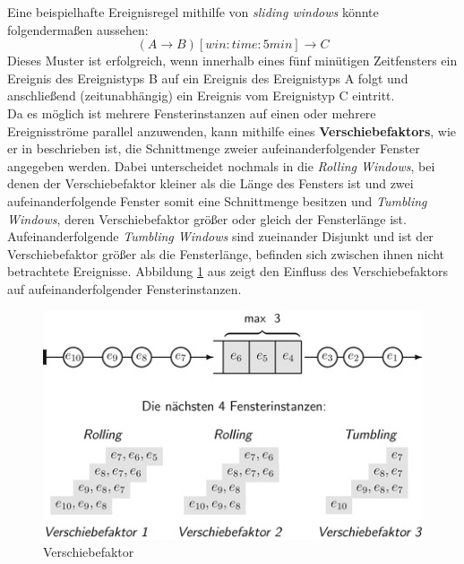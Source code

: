 \documentclass{acm_proc_article-sp}
\begin{document}
Eine beispielhafte Ereignisregel mithilfe von \textit{sliding windows} könnte 
folgendermaßen 
aussehen:
$$(A \rightarrow B)[win:time:5min] \rightarrow C$$
Dieses Muster ist erfolgreich, wenn innerhalb eines fünf minütigen Zeitfensters ein 
Ereignis des Ereignistyps B auf ein Ereignis des Ereignistyps A folgt und anschließend 
(zeitunabhängig) ein Ereignis vom Ereignistyp C eintritt.\\
Da es möglich ist mehrere Fensterinstanzen auf einen oder mehrere Ereignisströme parallel 
anzuwenden, kann mithilfe eines \textbf{Verschiebefaktors}\label{kap:verschiebefaktor}, 
wie er in \cite{hedtstuck} beschrieben 
ist, die Schnittmenge zweier aufeinanderfolgender Fenster angegeben werden. Dabei 
unterscheidet \cite{hedtstuck} nochmals in die \textit{Rolling Windows}, bei denen der 
Verschiebefaktor kleiner als die Länge des Fensters ist und zwei aufeinanderfolgende 
Fenster somit eine Schnittmenge besitzen und \textit{Tumbling Windows}, deren 
Verschiebefaktor größer oder gleich der Fensterlänge ist. Aufeinanderfolgende 
\textit{Tumbling Windows} sind zueinander Disjunkt und ist der Verschiebefaktor größer 
als die Fensterlänge, befinden sich zwischen ihnen nicht betrachtete Ereignisse. 
Abbildung \ref{img:factors} aus \cite{hedtstuck} zeigt den Einfluss des 
Verschiebefaktors auf aufeinanderfolgender Fensterinstanzen.

\begin{figure}[H]
    \centering
    \includegraphics[width=\linewidth]{img/factor-hedstuck}
    \caption{Verschiebefaktor}
    \label{img:factors}
\end{figure}
\end{document}
